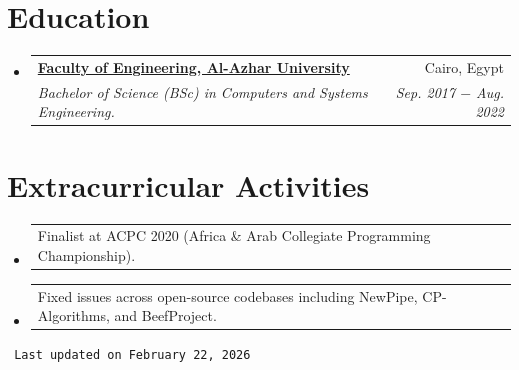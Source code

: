 \documentclass[letterpaper, 11pt]{article}
\makeatletter
\newcommand{\education}[6] {
	\vspace{-1pt}\item[]
  \begin{tabular*}{1\textwidth}[t]{l@{\extracolsep{\fill}}r}
		#1 \href{#2}{\textbf{\color{RoyalBlue}#3}} & #4 \\
    \textit{\small #5} & \textit{\small #6} \\
  \end{tabular*}
  \vspace{-4pt}
}
\newcommand{\extracurricularactivity}[3] {
	\vspace{1pt}\item
  \begin{tabular*}{0.97\textwidth}[t]{l@{\extracolsep{\fill}}r}
		#1 & \href{#2}{\color{RoyalBlue}#3} \\
  \end{tabular*}
  \vspace{-4pt}
}
\makeatother
\begin{document}
\section{Education}
\begin{itemize}[leftmargin=0pt]
  \education
  {\faIcon{university}}
	{https://eng-azhar.net/}
  {Faculty of Engineering, Al-Azhar University}{ Cairo, Egypt}
  {Bachelor of Science (BSc) in Computers and Systems Engineering.}{Sep. 2017 $-$ Aug. 2022}
\end{itemize}

\section{Extracurricular Activities}
\begin{itemize}[leftmargin=*]
  \extracurricularactivity
  {Finalist at ACPC 2020 (Africa \& Arab Collegiate Programming Championship).}
  {}{}

  \extracurricularactivity
  {Fixed issues across open-source codebases including NewPipe, CP-Algorithms, and BeefProject.}
  {}{}
\end{itemize}

\vfill
\begin{flushright}
	\texttt{\tiny
		\color{gray}
		Last updated on February 22, 2026
	}
\end{flushright}
\end{document}
